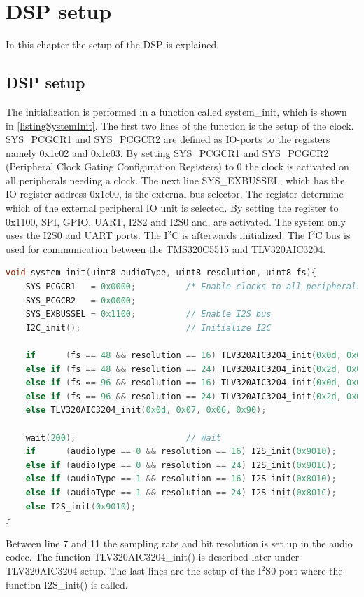\chapter{DSP setup}

In this chapter the setup of the DSP is explained. 

\section{DSP setup}

The initialization is performed in a function called system\_init, which is shown in \autoref{listingSystemInit}. The first two lines of the function is the setup of the clock. SYS\_PCGCR1 and SYS\_PCGCR2 are defined as IO-ports to the registers namely 0x1c02 and 0x1c03. By setting SYS\_PCGCR1 and SYS\_PCGCR2 (Peripheral Clock Gating Configuration Registers) to 0 the clock is activated on all peripherals needing a clock. The next line SYS\_EXBUSSEL, which has the IO register address 0x1c00, is the external bus selector. The register determine which of the external peripheral IO unit is selected. By setting the register to 0x1100, SPI, GPIO, UART, I2S2 and I2S0 and, are activated. The system only uses the I2S0 and UART ports. The I$^2$C is afterwards initialized. The I$^2$C bus is used for communication between the TMS320C5515 and TLV320AIC3204.

\begin{lstlisting}[language=C, caption = {System initialization},label={listingSystemInit}]
void system_init(uint8 audioType, uint8 resolution, uint8 fs){
    SYS_PCGCR1 	 = 0x0000;     		/* Enable clocks to all peripherals */
    SYS_PCGCR2 	 = 0x0000;
	SYS_EXBUSSEL = 0x1100;         	// Enable I2S bus
	I2C_init();        				// Initialize I2C
	
	if 		(fs == 48 && resolution == 16) TLV320AIC3204_init(0x0d, 0x07, 0x06, 0x90);
	else if (fs == 48 && resolution == 24) TLV320AIC3204_init(0x2d, 0x07, 0x06, 0x90);	
	else if (fs == 96 && resolution == 16) TLV320AIC3204_init(0x0d, 0x0E, 0x0D, 0x20);	
	else if	(fs == 96 && resolution == 24) TLV320AIC3204_init(0x2d, 0x0E, 0x0D, 0x20);
	else TLV320AIC3204_init(0x0d, 0x07, 0x06, 0x90);	
	
	wait(200);        				// Wait	
	if 		(audioType == 0 && resolution == 16) I2S_init(0x9010);
	else if (audioType == 0 && resolution == 24) I2S_init(0x901C);	
	else if (audioType == 1 && resolution == 16) I2S_init(0x8010);	
	else if	(audioType == 1 && resolution == 24) I2S_init(0x801C);
	else I2S_init(0x9010);
}
\end{lstlisting}
Between line 7 and 11 the sampling rate and bit resolution is set up in the audio codec. The function TLV320AIC3204\_init() is described later under TLV320AIC3204 setup. The last lines are the setup of the I$^2$S0 port where the function I2S\_init() is called.


